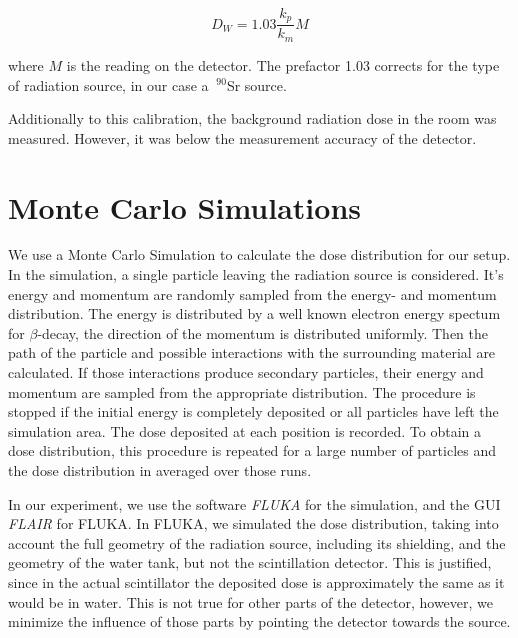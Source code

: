 \documentclass[a4paper,parskip]{scrartcl}
\begin{document}
$$D_W = 1.03\frac{k_p}{k_m}M$$

where $M$ is the reading on the detector. The prefactor 1.03 corrects for the type of radiation source, in our case a $~^{90}$Sr source.

Additionally to this calibration, the background radiation dose in the room was measured. However, it was below the measurement accuracy of the detector.

\section{Monte Carlo Simulations}
We use a Monte Carlo Simulation to calculate the dose distribution for our setup. In the simulation, a single particle leaving the radiation source is considered. It's energy and momentum are randomly sampled from the energy- and momentum distribution. The energy is distributed by a well known electron energy spectum for $\beta$-decay, the direction of the momentum is distributed uniformly. Then the path of the particle and possible interactions with the surrounding material are calculated. If those interactions produce secondary particles, their energy and momentum are sampled from the appropriate distribution. The procedure is stopped if the initial energy is completely deposited or all particles have left the simulation area. The dose deposited at each position is recorded. To obtain a dose distribution, this procedure is repeated for a large number of particles and the dose distribution in averaged over those runs.

In our experiment, we use the software \textit{FLUKA} for the simulation, and the GUI \textit{FLAIR} for FLUKA. In FLUKA, we simulated the dose distribution, taking into account the full geometry of the radiation source, including its shielding, and the geometry of the water tank, but not the scintillation detector. This is justified, since in the actual scintillator the deposited dose is approximately the same as it would be in water. This is not true for other parts of the detector, however, we minimize the influence of those parts by pointing the detector towards the source.

\end{document}
